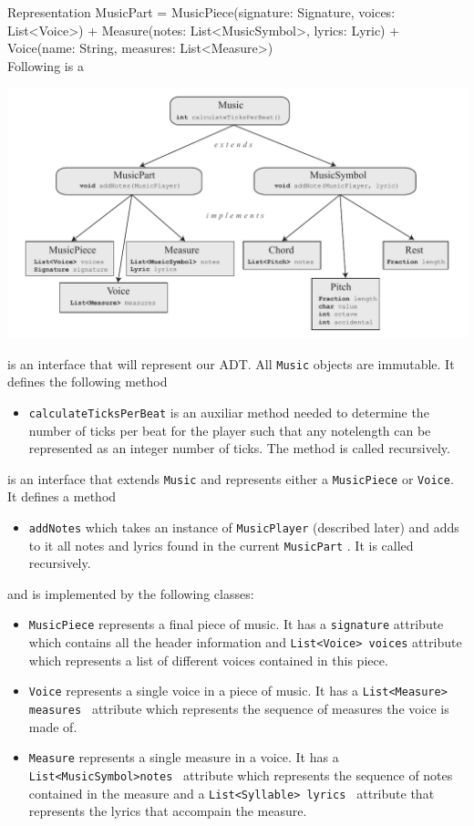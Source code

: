 \documentclass[12pt]{book}
\begin{document}
Representation MusicPart = MusicPiece(signature: Signature, voices: List<Voice>) + Measure(notes: List<MusicSymbol>, lyrics: Lyric) + Voice(name: String, measures: List<Measure>) \\

Following is a 

\centerline{ \includegraphics{Music.pdf}}

 is an interface that will represent our ADT. All {\tt Music} objects are immutable. It defines the following method

\begin{itemize} 

\item { \tt calculateTicksPerBeat} is an auxiliar method needed to determine the number of ticks per beat for the player such that any notelength can be represented as an integer number of ticks. The method is called recursively.
\end{itemize}

\medskip 

 is an interface that extends {\tt Music} and represents either a {\tt MusicPiece} or {\tt Voice}.  It defines a method
\begin{itemize} 
\item { \tt addNotes} which takes an instance of  {\tt MusicPlayer} (described later) and adds to it all notes and lyrics found in the current {\tt MusicPart}  . It is called recursively.
\end{itemize}

\noindent and is implemented by the following classes:
\begin{itemize} 
\item { \tt MusicPiece} represents a final piece of music.   It has a {\tt signature} attribute which contains all the header information and {\tt List<Voice> voices} attribute which represents a list of different voices contained in this piece.
\item {\tt Voice}  represents a single voice in a piece of music. It has a {\tt List<Measure> measures } attribute which represents the sequence of measures the voice is made of.
\item {\tt Measure}  represents a single measure in a voice. It has a {\tt List<MusicSymbol>notes } attribute which represents the sequence of notes contained in the measure and a  {\tt List<Syllable> lyrics } attribute that represents the lyrics that accompain the measure.
\end{itemize}
\end{document}
